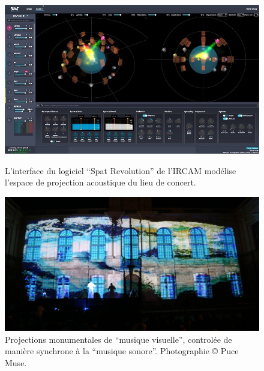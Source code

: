 \begin{figure}[!htbp]
	\captionsetup{format=plain}%
	\centering
	\begin{minipage}[t]{0.48\textwidth}
		\includegraphics[width=\linewidth]{gfx/06_visual_representation/IRCAM-spat.jpg}
		\caption[IRCAM Spat Revolution]{L'interface du logiciel ``Spat Revolution'' de l'IRCAM modélise l'espace de projection acoustique du lieu de concert.}
		\label{fig:visual_representation:spat}
	\end{minipage}
	\hspace{.02\linewidth}
	\begin{minipage}[t]{0.48\textwidth}
	    \includegraphics[width=\linewidth]{gfx/06_visual_representation/PuceMuse-Facade.jpg}
		\caption[Projection monumentale, Puce Muse]{Projections monumentales de ``musique visuelle'', controlée de manière synchrone à la ``musique sonore''. Photographie © Puce Muse.}
		\label{fig:visual_representation:pucemuse-monument}
	\end{minipage}
\end{figure}

